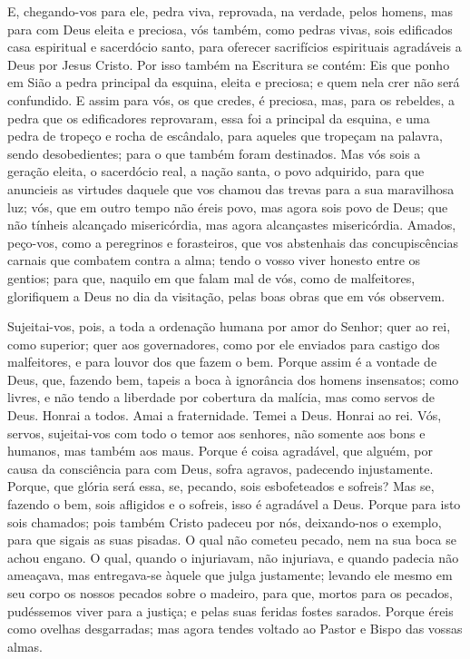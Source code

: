 E, chegando-vos para ele, pedra viva, reprovada, na verdade, pelos
homens, mas para com Deus eleita e preciosa, vós também, como
pedras vivas, sois edificados casa espiritual e sacerdócio santo,
para oferecer sacrifícios espirituais agradáveis a Deus por Jesus
Cristo. Por isso também na Escritura se contém: Eis que ponho em
Sião a pedra principal da esquina, eleita e preciosa; e quem nela
crer não será confundido. E assim para vós, os que credes, é
preciosa, mas, para os rebeldes, a pedra que os edificadores
reprovaram, essa foi a principal da esquina, e uma pedra de
tropeço e rocha de escândalo, para aqueles que tropeçam na palavra,
sendo desobedientes; para o que também foram destinados. Mas vós
sois a geração eleita, o sacerdócio real, a nação santa, o povo
adquirido, para que anuncieis as virtudes daquele que vos chamou das
trevas para a sua maravilhosa luz; vós, que em outro tempo
não éreis povo, mas agora sois povo de Deus; que não tínheis
alcançado misericórdia, mas agora alcançastes misericórdia.
Amados, peço-vos, como a peregrinos e forasteiros, que vos
abstenhais das concupiscências carnais que combatem contra a alma;
tendo o vosso viver honesto entre os gentios; para que,
naquilo em que falam mal de vós, como de malfeitores, glorifiquem a
Deus no dia da visitação, pelas boas obras que em vós observem.

Sujeitai-vos, pois, a toda a ordenação humana por amor do Senhor;
quer ao rei, como superior; quer aos governadores, como por
ele enviados para castigo dos malfeitores, e para louvor dos que
fazem o bem. Porque assim é a vontade de Deus, que, fazendo
bem, tapeis a boca à ignorância dos homens insensatos; como
livres, e não tendo a liberdade por cobertura da malícia, mas como
servos de Deus. Honrai a todos. Amai a fraternidade. Temei a
Deus. Honrai ao rei. Vós, servos, sujeitai-vos com todo o
temor aos senhores, não somente aos bons e humanos, mas também aos
maus. Porque é coisa agradável, que alguém, por causa da
consciência para com Deus, sofra agravos, padecendo injustamente.
Porque, que glória será essa, se, pecando, sois esbofeteados
e sofreis? Mas se, fazendo o bem, sois afligidos e o sofreis, isso é
agradável a Deus. Porque para isto sois chamados; pois também
Cristo padeceu por nós, deixando-nos o exemplo, para que sigais as
suas pisadas. O qual não cometeu pecado, nem na sua boca se
achou engano. O qual, quando o injuriavam, não injuriava, e
quando padecia não ameaçava, mas entregava-se àquele que julga
justamente; levando ele mesmo em seu corpo os nossos pecados
sobre o madeiro, para que, mortos para os pecados, pudéssemos viver
para a justiça; e pelas suas feridas fostes sarados. Porque
éreis como ovelhas desgarradas; mas agora tendes voltado ao Pastor e
Bispo das vossas almas.


